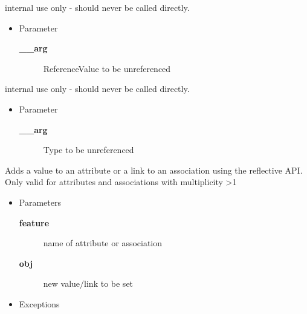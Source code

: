 \begin{desc}internal use only - should never be called directly.
\begin{itemize}
\item{Parameter
  \begin{description}
   \item[{\bf \_\_arg}]{ReferenceValue to be unreferenced}
  \end{description}}
\end{itemize}
\end{desc}

\begin{desc}internal use only - should never be called directly.
\begin{itemize}
\item{Parameter
  \begin{description}
   \item[{\bf \_\_arg}]{Type to be unreferenced}
  \end{description}}
\end{itemize}
\end{desc}

\begin{desc}Adds a value to an attribute or a link to an association using the
 reflective API. Only valid for attributes and associations with
 multiplicity \textgreater  1
\begin{itemize}
\item{Parameters
  \begin{description}
   \item[{\bf feature}]{name of attribute or association}
   \item[{\bf obj}]{new value$/$link to be set}
  \end{description}}
\end{itemize}
\begin{itemize}
\item{{Exceptions}
}
\end{itemize}
\end{desc}

